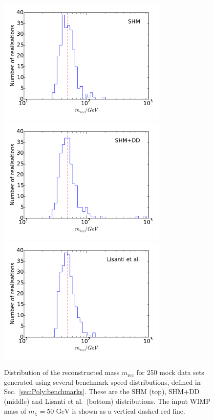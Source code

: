 \begin{figure}
\centering
  \includegraphics[trim=0cm 1cm 0cm 0.5cm,clip=true,width=0.75\textwidth]{Poly/SHM_ensemble.pdf}
  \includegraphics[trim=0cm 1cm 0cm 0.5cm,clip=true,width=0.75\textwidth]{Poly/DD_ensemble.pdf}
  \includegraphics[trim=0cm 1cm 0cm 0.5cm,clip=true,width=0.75\textwidth]{Poly/LIS_ensemble.pdf}
  \caption[Distribution of the reconstructed mass using a 50 GeV WIMP and SHM, SHM+DD and Lisanti et al. distribution functions]{Distribution of the reconstructed mass $m_\textrm{rec}$ for 250 mock data sets generated using several benchmark speed distributions, defined in Sec.~\ref{sec:Poly:benchmarks}. These are the SHM (top), SHM+DD (middle) and Lisanti et al.\ (bottom) distributions. The input WIMP mass of $m_\chi = 50 \textrm{ GeV}$ is shown as a vertical dashed red line.}
  \label{fig:Poly:Realisations}
\end{figure}

